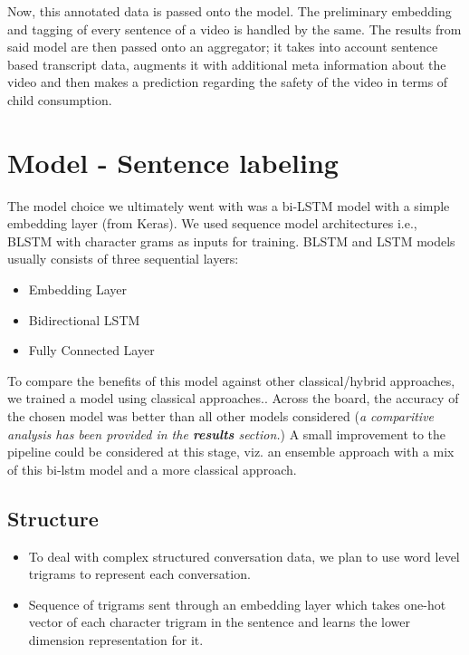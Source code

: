 \documentclass{article}[A4]
\begin{document}
Now, this annotated data is passed onto the model. The preliminary embedding and tagging of every sentence of a video is handled by the same. The results from said model are then passed onto an aggregator; it takes into account sentence based transcript data, augments it with additional meta information about the video and then makes a prediction regarding the safety of the video in terms of child consumption.

\section{Model - Sentence labeling}

The model choice we ultimately went with was a bi-LSTM model with a simple embedding layer (from Keras). We used sequence model architectures i.e., BLSTM with character grams as inputs for training. BLSTM and LSTM models usually consists of three sequential layers:
\begin{itemize}
	\item{Embedding Layer}
	\item{Bidirectional LSTM}
	\item{Fully Connected Layer}
\end{itemize}

To compare the benefits of this model against other classical/hybrid approaches, we trained a model using classical approaches.\citep{hateoffensive}. Across the board, the accuracy of the chosen model was better than all other models considered (\textit{a comparitive analysis has been provided in the \textbf{results} section.}) A small improvement to the pipeline could be considered at this stage, viz. an ensemble approach with a mix of this bi-lstm model and a more classical approach.

\subsection{Structure}


\begin{itemize}
	\item{To deal with complex structured conversation data, we plan to use word level trigrams to represent each conversation.}
	\item{Sequence of trigrams sent through an embedding layer which takes one-hot vector of each character trigram in the sentence and learns the lower dimension representation for it.}
\end{itemize}
\end{document}
